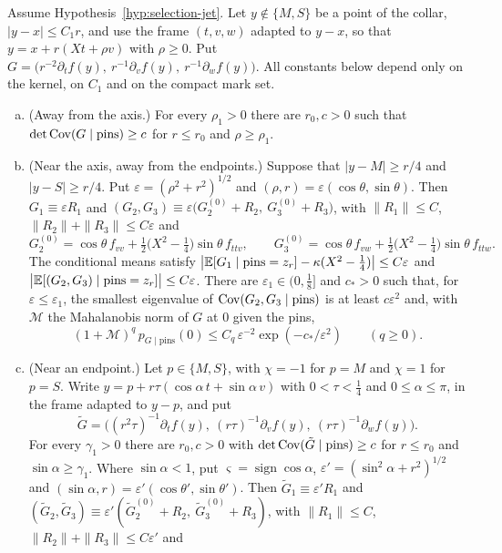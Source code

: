 \begin{lemma}\label{lem:selection-fincol}
Assume Hypothesis~\ref{hyp:selection-jet}. Let $y\notin\{M,S\}$ be a point of the collar, $|y-x|\le C_1r$, and use the frame $(t,v,w)$ adapted to $y-x$, so that $y=x+r(Xt+\rho v)$ with $\rho\ge0$. Put $G=\bigl(r^{-2}\partial_tf(y),\ r^{-1}\partial_vf(y),\ r^{-1}\partial_wf(y)\bigr)$. All constants below depend only on the kernel, on $C_1$ and on the compact mark set.
\begin{enumerate}[(a)]
\item (Away from the axis.) For every $\rho_1>0$ there are $r_0,c>0$ such that $\det\operatorname{Cov}(G\mid\text{pins})\ge c$ for $r\le r_0$ and $\rho\ge\rho_1$.
\item (Near the axis, away from the endpoints.) Suppose that $|y-M|\ge r/4$ and $|y-S|\ge r/4$. Put $\varepsilon=(\rho^2+r^2)^{1/2}$ and $(\rho,r)=\varepsilon(\cos\theta,\sin\theta)$. Then $G_1\equiv\varepsilon R_1$ and $(G_2,G_3)\equiv\varepsilon\bigl(G^{(0)}_2+R_2,\ G^{(0)}_3+R_3\bigr)$, with $\|R_1\|\le C$, $\|R_2\|+\|R_3\|\le C\varepsilon$ and
\begin{equation}\label{eq:selection-Glim}
G^{(0)}_2=\cos\theta\,f_{vv}+\tfrac12\bigl(X^2-\tfrac14\bigr)\sin\theta\,f_{ttv},\qquad G^{(0)}_3=\cos\theta\,f_{vw}+\tfrac12\bigl(X^2-\tfrac14\bigr)\sin\theta\,f_{ttw}.
\end{equation}
The conditional means satisfy $\bigl|\mathbb E[G_1\mid\text{pins}=z_r]-\kappa(X^2-\frac14)\bigr|\le C\varepsilon$ and $\bigl|\mathbb E[(G_2,G_3)\mid\text{pins}=z_r]\bigr|\le C\varepsilon$. There are $\varepsilon_1\in(0,\frac18]$ and $c_*>0$ such that, for $\varepsilon\le\varepsilon_1$, the smallest eigenvalue of $\operatorname{Cov}(G_2,G_3\mid\text{pins})$ is at least $c\varepsilon^2$ and, with $\mathcal M$ the Mahalanobis norm of $G$ at $0$ given the pins,
\[
(1+\mathcal M)^q\,p_{G\mid\text{pins}}(0)\le C_q\,\varepsilon^{-2}\exp(-c_*/\varepsilon^2)\qquad(q\ge0).
\]
\item (Near an endpoint.) Let $p\in\{M,S\}$, with $\chi=-1$ for $p=M$ and $\chi=1$ for $p=S$. Write $y=p+r\tau(\cos\alpha\,t+\sin\alpha\,v)$ with $0<\tau<\frac14$ and $0\le\alpha\le\pi$, in the frame adapted to $y-p$, and put
\[
\tilde G=\bigl((r^2\tau)^{-1}\partial_tf(y),\ (r\tau)^{-1}\partial_vf(y),\ (r\tau)^{-1}\partial_wf(y)\bigr).
\]
For every $\gamma_1>0$ there are $r_0,c>0$ with $\det\operatorname{Cov}(\tilde G\mid\text{pins})\ge c$ for $r\le r_0$ and $\sin\alpha\ge\gamma_1$. Where $\sin\alpha<1$, put $\varsigma=\operatorname{sign}\cos\alpha$, $\varepsilon'=(\sin^2\alpha+r^2)^{1/2}$ and $(\sin\alpha,r)=\varepsilon'(\cos\theta',\sin\theta')$. Then $\tilde G_1\equiv\varepsilon'R_1$ and $(\tilde G_2,\tilde G_3)\equiv\varepsilon'(\tilde G^{(0)}_2+R_2,\ \tilde G^{(0)}_3+R_3)$, with $\|R_1\|\le C$, $\|R_2\|+\|R_3\|\le C\varepsilon'$ and

\end{enumerate}
\end{lemma}

